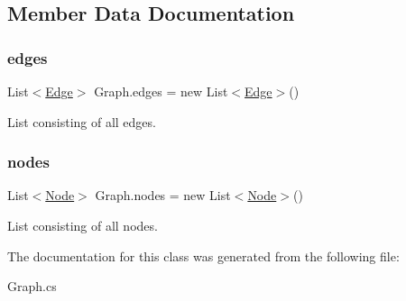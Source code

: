 \subsection{Member Data Documentation}
\mbox{\label{class_graph_a4647d3fa90942e128f3f4612a4838c23}} 
\subsubsection{\texorpdfstring{edges}{edges}}
{\footnotesize\ttfamily List$<$\mbox{\hyperlink{class_edge}{Edge}}$>$ Graph.\+edges = new List$<$\mbox{\hyperlink{class_edge}{Edge}}$>$()}



List consisting of all edges. 

\mbox{\label{class_graph_a5ecc9c1538b1c81f615e5cfd12f29816}} 
\subsubsection{\texorpdfstring{nodes}{nodes}}
{\footnotesize\ttfamily List$<$\mbox{\hyperlink{class_node}{Node}}$>$ Graph.\+nodes = new List$<$\mbox{\hyperlink{class_node}{Node}}$>$()}



List consisting of all nodes. 



The documentation for this class was generated from the following file\+:\begin{DoxyCompactItemize}
\item 
Graph.\+cs\end{DoxyCompactItemize}
